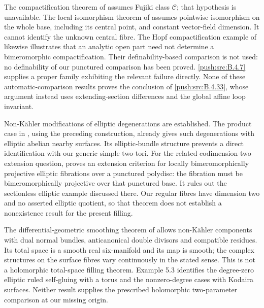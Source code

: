 The compactification theorem of
\citet[Theorem 1.2]{BiliottiGhigi2021Root} assumes Fujiki
class $\mathcal C$; that hypothesis is unavailable.
The local isomorphism theorem of
\citet[Theorem 3]{Meersseman2011Root} assumes pointwise
isomorphism on the whole base, including its central point,
and constant vector-field dimension. It cannot identify the
unknown central fibre. The Hopf compactification example of
\citet[Example 1]{KatzarkovEtAl2025Root} likewise illustrates
that an analytic open part need not determine a bimeromorphic
compactification. Their definability-based comparison is not
used: no definability of our punctured comparison has been
proved. \ref{push:src:B.4.7} supplies a proper family exhibiting the relevant
failure directly. None of these automatic-comparison results
proves the conclusion of \ref{push:src:B.4.33}, whose argument instead uses
extending-section differences and the global affine loop invariant.

Non-K\"ahler modifications of elliptic degenerations are
established. The product case in
\citet[Section 3, Example 3.4(1)]{Fujimoto1988Root}, using
the preceding construction, already gives such degenerations
with elliptic abelian nearby surfaces. Its elliptic-bundle
structure prevents a direct identification with our generic
simple two-tori. For the related codimension-two extension
question, \citet[Theorem 7.1.3]{Nakayama2002Root} proves an
extension criterion for locally bimeromorphically projective
elliptic fibrations over a punctured polydisc: the fibration
must be bimeromorphically projective over that punctured base.
It rules out the sectionless elliptic example discussed there.
Our regular fibres have dimension two and no asserted elliptic
quotient, so that theorem does not establish a nonexistence
result for the present filling.

The differential-geometric smoothing theorem of
\citet[Theorem 5.5, pp.~882--883]{Doi2009Root} allows
non-K\"ahler components with dual normal bundles,
anticanonical double divisors and compatible residues.
Its total space is a smooth real six-manifold and its
map is smooth; the complex structures on the surface
fibres vary continuously in the stated sense.
This is not a holomorphic total-space filling theorem.
Example 5.3 identifies the degree-zero elliptic ruled
self-gluing with a torus and the nonzero-degree cases
with Kodaira surfaces. Neither result supplies the
prescribed holomorphic two-parameter comparison at our
missing origin.




